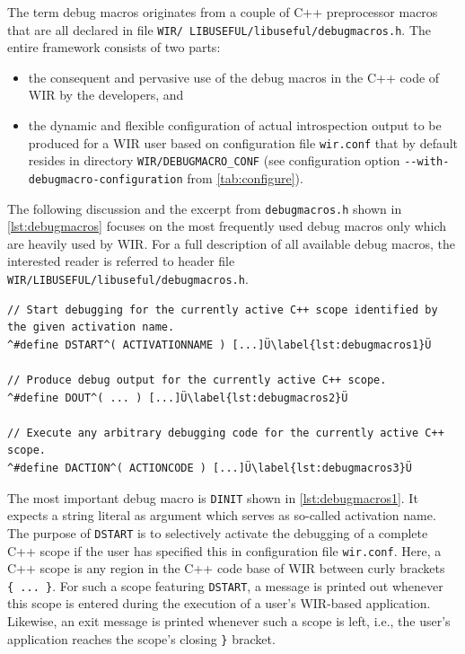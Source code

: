 The term debug macros originates from a couple of C++ preprocessor macros that are all declared in file \texttt{WIR/ LIBUSEFUL/libuseful/debugmacros.h}.
The entire framework consists of two parts:
\begin{itemize}
  \item the consequent and pervasive use of the debug macros in the C++ code of \gls{WIR} by the developers, and
  \item the dynamic and flexible configuration of actual introspection output to be produced for a \gls{WIR} user based on configuration file \texttt{wir.conf} that by default resides in directory \texttt{WIR/DEBUGMACRO\_CONF} (see configuration option \texttt{-{}-with-debugmacro-configuration} from \cref{tab:configure}).
\end{itemize}

The following discussion and the excerpt from \texttt{debugmacros.h} shown in \cref{lst:debugmacros} focuses on the most frequently used debug macros only which are heavily used by \gls{WIR}.
For a full description of all available debug macros, the interested reader is referred to header file \texttt{WIR/LIBUSEFUL/libuseful/debugmacros.h}.

\begin{lstlisting}[style=code,float=ht,caption={Most Relevant Debug Macros from \texttt{WIR/LIBUSEFUL/libuseful/debugmacros.h}},label=lst:debugmacros]
// Start debugging for the currently active C++ scope identified by the given activation name.
^#define DSTART^( ACTIVATIONNAME ) [...]Ü\label{lst:debugmacros1}Ü

// Produce debug output for the currently active C++ scope.
^#define DOUT^( ... ) [...]Ü\label{lst:debugmacros2}Ü

// Execute any arbitrary debugging code for the currently active C++ scope.
^#define DACTION^( ACTIONCODE ) [...]Ü\label{lst:debugmacros3}Ü
\end{lstlisting}

The most important debug macro is \texttt{DINIT} shown in \cref{lst:debugmacros1}.
It expects a string literal as argument which serves as so-called activation name.
The purpose of \texttt{DSTART} is to selectively activate the debugging of a complete C++ scope if the user has specified this in configuration file \texttt{wir.conf}.
Here, a C++ scope is any region in the C++ code base of \gls{WIR} between curly brackets \texttt{\{\ ...\ \}}.
For such a scope featuring \texttt{DSTART}, a message is printed out whenever this scope is entered during the execution of a user's \gls{WIR}-based application.
Likewise, an exit message is printed whenever such a scope is left, i.e., the user's application reaches the scope's closing \texttt{\}} bracket.

